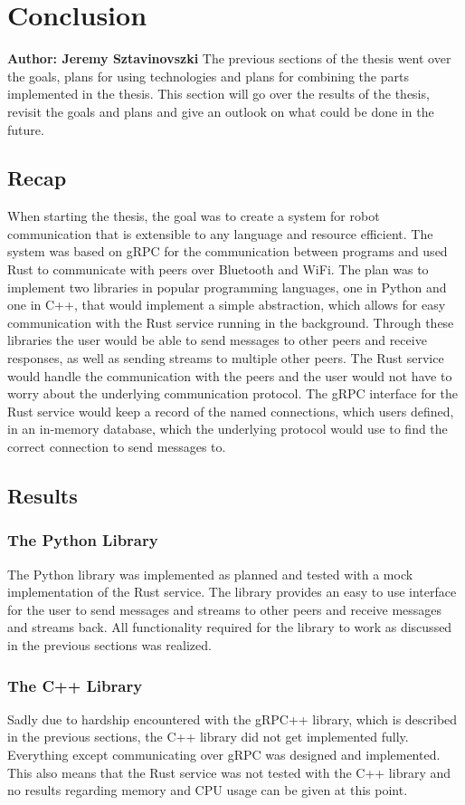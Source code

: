 \chapter{Conclusion}

\textbf{Author: Jeremy Sztavinovszki} 
The previous sections of the thesis went over the goals, plans for using technologies and plans for combining the parts implemented in the thesis.
This section will go over the results of the thesis, revisit the goals and plans and give an outlook on what could be done in the future.

\section{Recap}
When starting the thesis, the goal was to create a system for robot communication that is extensible to any language and resource efficient. The system was based on gRPC for the communication between programs
and used Rust to communicate with peers over Bluetooth and WiFi. The plan was to implement two libraries in popular programming languages, one in Python and one in C++, that would implement a simple abstraction,
which allows for easy communication with the Rust service running in the background. Through these libraries the user would be able to send messages to other peers and receive responses, as well as sending streams to multiple
other peers. The Rust service would handle the communication with the peers and the user would not have to worry about the underlying communication protocol. The gRPC interface for the Rust service would keep a record of
the named connections, which users defined, in an in-memory database, which the underlying protocol would use to find the correct connection to send messages to.

\section{Results}
\subsection{The Python Library}
The Python library was implemented as planned and tested with a mock implementation of the Rust service. The library provides an easy to use interface for the user to send messages and streams to other peers and receive messages and streams back.
All functionality required for the library to work as discussed in the previous sections was realized.

\subsection{The C++ Library}
Sadly due to hardship encountered with the gRPC++ library, which is described in the previous sections, the C++ library did not get implemented fully. Everything except communicating over gRPC was designed and implemented.
This also means that the Rust service was not tested with the C++ library and no results regarding memory and CPU usage can be given at this point.

